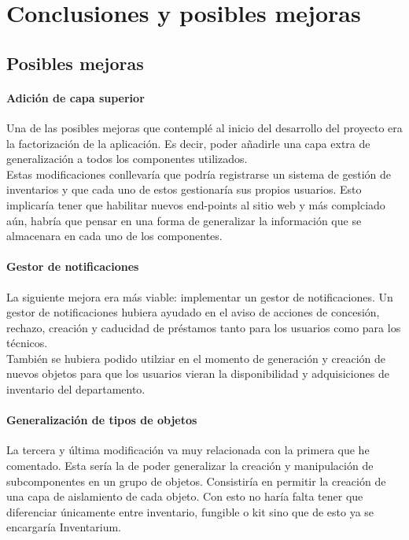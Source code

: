 \chapter{Conclusiones y posibles mejoras}
\section{Posibles mejoras}
\subsubsection{Adición de capa superior}
Una de las posibles mejoras que contemplé al inicio del desarrollo del proyecto era la factorización de la aplicación. Es decir, poder añadirle una capa extra de generalización a todos los componentes utilizados.
\\Estas modificaciones conllevaría que podría registrarse un sistema de gestión de inventarios y que cada uno de estos gestionaría sus propios usuarios. Esto implicaría tener que habilitar nuevos end-points al sitio web y más complciado aún, habría que pensar en una forma de generalizar la información que se almacenara en cada uno de los componentes.
\subsubsection{Gestor de notificaciones}
La siguiente mejora era más viable: implementar un gestor de notificaciones. Un gestor de notificaciones hubiera ayudado en el aviso de acciones de concesión, rechazo, creación y caducidad de préstamos tanto para los usuarios como para los técnicos.
\\También se hubiera podido utilziar en el momento de generación y creación de nuevos objetos para que los usuarios vieran la disponibilidad y adquisiciones de inventario del departamento.
\subsubsection{Generalización de tipos de objetos}
La tercera y última modificación va muy relacionada con la primera que he comentado. Esta sería la de poder generalizar la creación y manipulación de subcomponentes en un grupo de objetos. Consistiría en permitir la creación de una capa de aislamiento de cada objeto. Con esto no haría falta tener que diferenciar únicamente entre inventario, fungible o kit sino que de esto ya se encargaría Inventarium.

